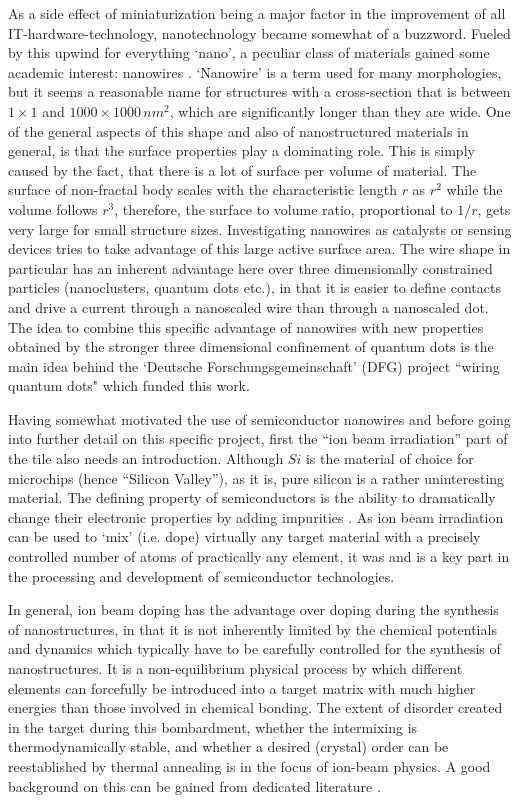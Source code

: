 As a side effect of miniaturization being a major factor in the improvement of all IT-hardware-technology, nanotechnology became somewhat of a buzzword. Fueled by this upwind for everything `nano', a peculiar class of materials gained some academic interest: nanowires \cite{xia_one-dimensional_2003,lieber_functional_2007}. `Nanowire' is a term used for many morphologies, but it seems a reasonable name for structures with a cross-section that is between $1\times1$ and $1000\times1000\,nm^2$, which are significantly longer than they are wide. One of the general aspects of this shape and also of nanostructured materials in general, is that the surface properties play a dominating role. This is simply caused by the fact, that there is a lot of surface per volume of material. The surface of non-fractal body scales with the characteristic length $r$ as $r^2$ while the volume follows $r^3$, therefore, the surface to volume ratio, proportional to $1/r$, gets very large for small structure sizes. Investigating nanowires as catalysts or sensing devices tries to take advantage of this large active surface area. The wire shape in particular has an inherent advantage here over three dimensionally constrained particles (nanoclusters, quantum dots etc.), in that it is easier to define contacts and drive a current through a nanoscaled wire than through a nanoscaled dot. The idea to combine this specific advantage of nanowires with new properties obtained by the stronger three dimensional confinement of quantum dots is the main idea behind the `Deutsche Forschungsgemeinschaft' (DFG) project ``wiring quantum dots" which funded this work. 

Having somewhat motivated the use of semiconductor nanowires and before going into further detail on this specific project, first the ``ion beam irradiation'' part of the tile also needs an introduction. Although $Si$ is the material of choice for microchips (hence ``Silicon Valley''), as it is, pure silicon is a rather uninteresting material. The defining property of semiconductors is the ability to dramatically change their electronic properties by adding impurities \cite{sze_physics_2006}. As ion beam irradiation can be used to `mix' (i.e. dope) virtually any target material with a precisely controlled number of atoms of practically any element, it was and is a key part in the processing and development of semiconductor technologies. 

In general, ion beam doping has the advantage over doping during the synthesis of nanostructures, in that it is not inherently limited by the chemical potentials and dynamics which typically have to be carefully controlled for the synthesis of nanostructures. It is a non-equilibrium physical process by which different elements can forcefully be introduced into a target matrix with much higher energies than those involved in chemical bonding. The extent of disorder created in the target during this bombardment, whether the intermixing is thermodynamically stable, and whether a desired (crystal) order can be reestablished by thermal annealing is in the focus of ion-beam physics. A good background on this can be gained from dedicated literature \cite{ziegler_stopping_1985,eckstein_computer_1991,nastasi/mayer/hirvonen_ion-solid_2008,schmidt_ion_2012}.

